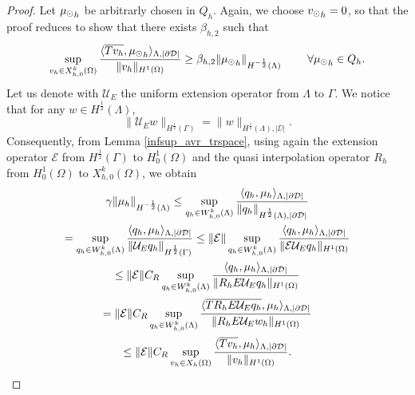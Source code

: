 \begin{proof}
Let ${\mu_{\odot}}_h$ be arbitrarly chosen in $Q_h$. Again, we choose ${v_{\odot}}_h =0$, so that the proof reduces to show that there exists $\beta_{h,2}$ such that
\begin{equation*}
\sup_{v_h \in X_{h,0}^k(\Omega)} \frac{ \langle \overline{T v_h} , {\mu_{\odot}}_h \rangle _{\Lambda,|\partial\mathcal{D}|} } {\|v_h\|_{H^1(\Omega)} }\geq \beta_{h,2} \|{\mu_{\odot}}_h\|_{H^{-\frac 12}(\Lambda)}\ \qquad \forall {\mu_{\odot}}_h \in Q_h.
\end{equation*}
Let us denote with $\mathcal{U}_E$ the uniform extension operator from $\Lambda$ to $\Gamma$. {\color{red}We notice that for any $w \in H^{\frac 12}(\Lambda)$,
\begin{equation*}
\|\mathcal{U}_E w\|_{H^{\frac 12}(\Gamma)}= \|w\|_{H^{\frac 12}(\Lambda),|\DD|}.
\end{equation*}
}
Consequently, from Lemma \ref{infsup_avr_trspace}, using again the extension operator $\mathcal{E}$ from $H^{\frac 12}(\Gamma)$ to $H^1_0(\Omega)$ and the quasi interpolation operator $R_h$ from $H^1_0(\Omega)$ to $X_{h,0}^k(\Omega)$, we obtain
\begin{multline}
\gamma \|\mu_h\|_{H^{-\frac 12}(\Lambda)} \leq 
\sup_{q_h \in W_{h,0}^k(\Lambda)} \frac{ \langle q_h, \mu_h \rangle_{\Lambda,|\partial\mathcal{D}|} } {\|q_h\|_{H^{\frac 12}(\Lambda),|\partial\mathcal{D}|}} 
\\
=  \sup_{q_h \in W_{h,0}^k(\Lambda)} \frac{ \langle q_h, \mu_h \rangle _{\Lambda,|\partial\mathcal{D}|}} {\|\mathcal{U}_E q_h\|_{H^{\frac 12}(\Gamma)}} 
\leq \|\mathcal{E}\| \sup_{q_h \in W_{h,0}^k(\Lambda)} \frac{ \langle q_h, \mu_h \rangle _{\Lambda,|\partial\mathcal{D}|} } {\|\mathcal{E} \mathcal{U}_E q_h\|_{H^1(\Omega)}} 
\\
\leq \|\mathcal{E}\| C_R \sup_{q_h \in W_{h,0}^k(\Lambda)} \frac{ \langle q_h, \mu_h \rangle _{\Lambda,|\partial\mathcal{D}|} } {\|R_h E \mathcal{U}_E q_h\|_{H^1(\Omega)}}
\\ 
=  \|\mathcal{E}\| C_R \sup_{q_h \in W_{h,0}^k(\Lambda)} \frac{ \langle 	\overline{T  R_h E \mathcal{U}_E q_h}, \mu_h \rangle _{\Lambda,|\partial\mathcal{D}|}} {\|R_h E \mathcal{U}_E w_h\|_{H^1(\Omega)}}
\\
\leq \|\mathcal{E}\| C_R \sup_{v_h \in X_h(\Omega)} \frac{ \langle \overline{T v_h}, \mu_h \rangle _{\Lambda,|\partial\mathcal{D}|}} {\|v_h\|_{H^1(\Omega)}}. 
\end{multline}

\end{proof}